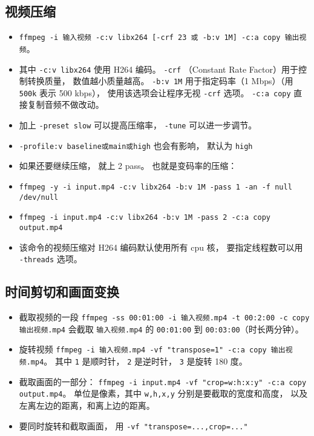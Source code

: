 \subsection{视频压缩}
\begin{itemize}
\item \verb`ffmpeg -i 输入视频 -c:v libx264 [-crf 23 或 -b:v 1M] -c:a copy 输出视频`。
\item 其中 \verb`-c:v libx264` 使用 H264 编码。 \verb`-crf` （Constant Rate Factor）用于控制转换质量， 数值越小质量越高。 \verb`-b:v 1M` 用于指定码率（1 Mbps）（用 \verb`500k` 表示 500 kbps）， 使用该选项会让程序无视 \verb`-crf` 选项。 \verb`-c:a copy` 直接复制音频不做改动。
\item 加上 \verb`-preset slow` 可以提高压缩率， \verb`-tune` 可以进一步调节。
\item \verb`-profile:v baseline或main或high` 也会有影响， 默认为 \verb`high`
\item 如果还要继续压缩， 就上 2 pass。 也就是变码率的压缩：
\item \verb`ffmpeg -y -i input.mp4 -c:v libx264 -b:v 1M -pass 1 -an -f null /dev/null`
\item \verb`ffmpeg -i input.mp4 -c:v libx264 -b:v 1M -pass 2 -c:a copy output.mp4`
\item 该命令的视频压缩对 H264 编码默认使用所有 cpu 核， 要指定线程数可以用 \verb`-threads` 选项。
\end{itemize}

\subsection{时间剪切和画面变换}
\begin{itemize}
\item 截取视频的一段 \verb`ffmpeg -ss 00:01:00 -i 输入视频.mp4 -t 00:2:00 -c copy 输出视频.mp4` 会截取 \verb`输入视频.mp4` 的 \verb`00:01:00` 到 \verb`00:03:00`（时长两分钟）。
\item 旋转视频 \verb`ffmpeg -i 输入视频.mp4 -vf "transpose=1" -c:a copy 输出视频.mp4`。 其中 \verb`1` 是顺时针， \verb`2` 是逆时针， \verb`3` 是旋转 180 度。
\item 截取画面的一部分： \verb`ffmpeg -i input.mp4 -vf "crop=w:h:x:y" -c:a copy output.mp4`。 单位是像素，其中 \verb`w,h,x,y` 分别是要截取的宽度和高度， 以及左离左边的距离，和离上边的距离。
\item 要同时旋转和截取画面， 用 \verb`-vf "transpose=...,crop=..."`
\end{itemize}

